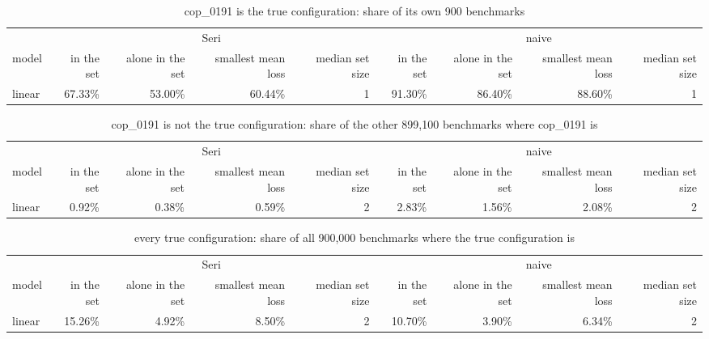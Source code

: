\begin{table}[htbp]
\centering
\caption{cop\_0191 is the true configuration: share of its own 900 benchmarks}
\label{tab:seri_against_naive_cop_0191_truth}
\begin{tabular}{lrrrrrrrr}
\hline
 & \multicolumn{4}{c}{Seri} & \multicolumn{4}{c}{naive} \\
model & in the set & alone in the set & smallest mean loss & median set size & in the set & alone in the set & smallest mean loss & median set size \\
\hline
linear & 67.33\% & 53.00\% & 60.44\% & 1 & 91.30\% & 86.40\% & 88.60\% & 1 \\
\hline
\end{tabular}
\end{table}

\begin{table}[htbp]
\centering
\caption{cop\_0191 is not the true configuration: share of the other 899,100 benchmarks where cop\_0191 is}
\label{tab:seri_against_naive_cop_0191_wrong_answer}
\begin{tabular}{lrrrrrrrr}
\hline
 & \multicolumn{4}{c}{Seri} & \multicolumn{4}{c}{naive} \\
model & in the set & alone in the set & smallest mean loss & median set size & in the set & alone in the set & smallest mean loss & median set size \\
\hline
linear & 0.92\% & 0.38\% & 0.59\% & 2 & 2.83\% & 1.56\% & 2.08\% & 2 \\
\hline
\end{tabular}
\end{table}

\begin{table}[htbp]
\centering
\caption{every true configuration: share of all 900,000 benchmarks where the true configuration is}
\label{tab:seri_against_naive_cop_0191_every_truth}
\begin{tabular}{lrrrrrrrr}
\hline
 & \multicolumn{4}{c}{Seri} & \multicolumn{4}{c}{naive} \\
model & in the set & alone in the set & smallest mean loss & median set size & in the set & alone in the set & smallest mean loss & median set size \\
\hline
linear & 15.26\% & 4.92\% & 8.50\% & 2 & 10.70\% & 3.90\% & 6.34\% & 2 \\
\hline
\end{tabular}
\end{table}

